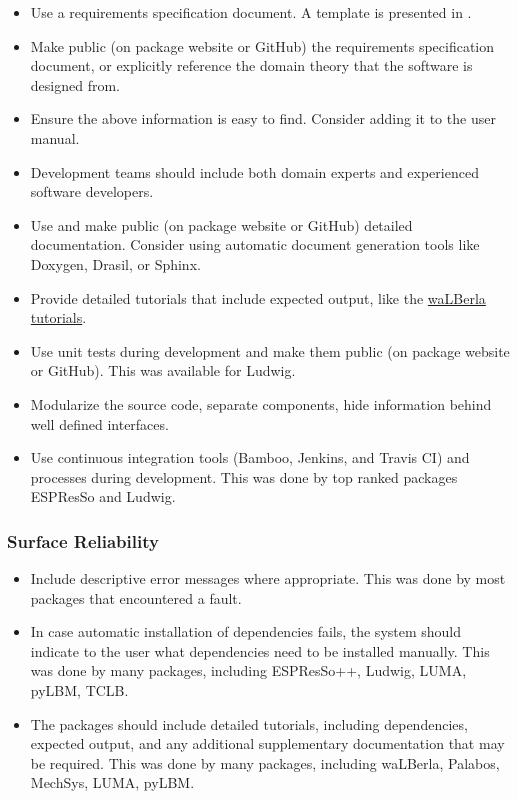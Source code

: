 \documentclass[12pt, notitlepage]{article}
\begin{document}
\begin{itemize}
	\item Use a requirements specification document. A template is presented in \citep{smith2005new}. 
	\item Make public (on package website or GitHub) the requirements specification document, or explicitly reference the domain theory that the software is designed from.
	\item Ensure the above information is easy to find. Consider adding it to the user manual. 
	\item Development teams should include both domain experts and experienced software developers.
	\item Use and make public (on package website or GitHub) detailed documentation. Consider using automatic document generation tools like Doxygen, Drasil, or Sphinx.
	\item Provide detailed tutorials that include expected output, like the \href{https://www.walberla.net/doxygen/index.html}{waLBerla tutorials}.
	\item Use unit tests during development and make them public (on package website or GitHub). This was available for Ludwig.
	\item Modularize the source code, separate components, hide information  behind well defined interfaces.
	\item Use continuous integration tools (Bamboo, Jenkins, and Travis CI) and processes during development. This was done by top ranked packages ESPResSo and Ludwig.
\end{itemize}

\subsubsection{Surface Reliability}

\begin{itemize}
	\item Include descriptive error messages where appropriate. This was done by most packages that encountered a fault.
	\item In case automatic installation of dependencies fails, the system should indicate to the user what dependencies need to be installed manually. This was done by many packages, including ESPResSo++, Ludwig, LUMA, pyLBM, TCLB.
	\item The packages should include detailed tutorials, including dependencies, expected output, and any additional supplementary documentation that may be required. This was done by many packages, including waLBerla, Palabos, MechSys, LUMA, pyLBM.
\end{itemize}
\end{document}
